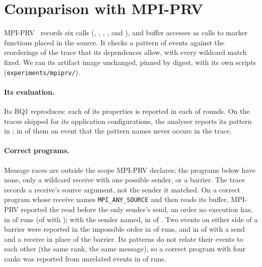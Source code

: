 \section{Comparison with MPI-PRV}
\label{app:mpiprv}

MPI-PRV~\citep{yao26mpiprv} records six calls (, , ,
,  and ), and buffer accesses as calls to marker
functions placed in the source. It checks a pattern of events against the reorderings of the
trace that its dependences allow, with every wildcard match fixed. We ran its artifact image
unchanged, pinned by digest, with its own scripts (\texttt{experiments/mpiprv/}).

\paragraph{Its evaluation.} Its RQ1 reproduces: each of its \nPRVrqOneProps properties is
reported in each of \nPRVrqOneRounds rounds. On the traces shipped for its \nPRVrqTwoConfigs
application configurations, the analyser reports its pattern in \nPRVrqTwoMatched; in
\nPRVrqTwoAbsent of them an event that the pattern names never occurs in the trace.

\paragraph{Correct programs.} Message races are outside the scope MPI-PRV declares; the programs
below have none, only a wildcard receive with one possible sender, or a barrier. The trace
records a receive's source argument, not the sender it
matched. On a correct program whose receive names \texttt{MPI\_ANY\_SOURCE} and then reads its
buffer, MPI-PRV reported the read before the only sender's send, an order no execution has, in
\nPRVprobeWildRecvAny of \nPRVprobeWildRecvAnyRuns runs (\nPRVprobeWildIrecvAny of
\nPRVprobeWildIrecvAnyRuns with ); with the sender named, in
\nPRVprobeWildRecvSrc of \nPRVprobeWildRecvSrcRuns. Two events on either side of a barrier were
reported in the impossible order in \nPRVprobeOrderBarrierBa of \nPRVprobeOrderBarrierBaRuns
runs, and in \nPRVprobeOrderSendrecvBa of \nPRVprobeOrderSendrecvBaRuns with a send and a
receive in place of the barrier. Its patterns do not relate their events to each other (the
same rank, the same message), so a correct program with four ranks was reported from unrelated
events in \nPRVprobeUnrelated of \nPRVprobeUnrelatedRuns runs.

